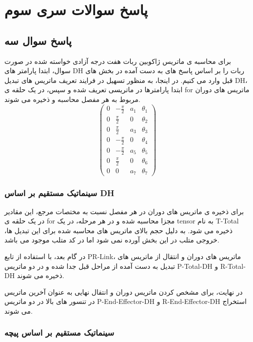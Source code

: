 
\chapter*{پاسخ سوالات سری سوم}
\section*{پاسخ سوال سه}

برای محاسبه ی ماتریس ژاکوبین ربات هفت درجه آزادی خواسته شده در صورت سوال، ابتدا پارامتر های DH ربات را بر اساس پاسخ های به دست آمده در بخش های قبل وارد می کنیم. در اینجا، به منظور تسهیل در فرایند تعریف ماتریس های تبدیل DH، ابتدا پارامترها در ماتریسی تعریف شده و سپس، در یک حلقه ی for ماتریس های دوران مربوط به هر مفصل محاسبه و ذخیره می شوند. 
\[
\begin{pmatrix}
	0 & -\frac{\pi}{2} & a_1 & \theta_1 \\
	0 & \frac{\pi}{2} & 0 & \theta_2 \\
	0 & \frac{\pi}{2} & a_3 & \theta_3 \\
	0 & -\frac{\pi}{2} & 0 & \theta_4 \\
	0 & -\frac{\pi}{2} & a_5 & \theta_5 \\
	0 & \frac{\pi}{2} & 0 & \theta_6 \\
	0 & 0 & a_7 & \theta_7
\end{pmatrix}
\]

\subsection*{سینماتیک مستقیم بر اساس DH}
برای ذخیره ی ماتریس های دوران در هر مفصل نسبت به مختصات مرجع، این مقادیر در یک حلقه ی for مجزا محاسبه شده و در هر مرحله، در یک tensor به نام T-Total ذخیره می شود. به دلیل حجم بالای ماتریس های محاسبه شده برای این تبدیل ها، خروجی متلب در این بخش آورده نمی شود اما در کد متلب موجود می باشد.

در گام بعد، با استفاده از تابع PR-Link، ماتریس های دوران و انتقال از ماتریس های تبدیل به دست آمده از مراحل قبل جدا شده و در دو ماتریس P-Total-DH و R-Total-DH ذخیره می شوند.

در نهایت، برای مشخص کردن ماتریس دوران و انتقال نهایی به عنوان آخرین ماتریس در تنسور های بالا در دو ماتریس P-End-Effector-DH و R-End-Effector-DH استخراج می شوند.

\subsection*{سینماتیک مستقیم بر اساس پیچه}

